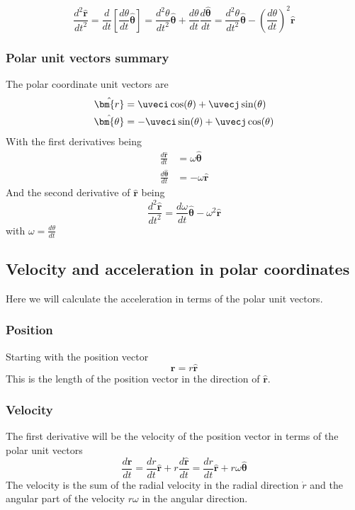 \begin{equation} \label{eq:radvel}
\frac{d^2 {\hat{\bm{r}}}}{d t^2} = \frac{d}{dt}\left[ \frac{ d \theta}{d t} \hat{\bm{\theta}} \right]=\frac{d^2 \theta}{d t^2}\hat{\bm{\theta}}+\frac{d \theta}{d t} \frac{d \hat{\bm{\theta}}}{dt}=\frac{d^2 \theta}{d t^2}\hat{\bm{\theta}}-\left(\frac{d \theta}{d t} \right)^2  \hat{\bm{r}} 
\end{equation}

\begin{framed}
\subsubsection*{Polar unit vectors summary}
The polar coordinate unit vectors are
\begin{align*}
\hat{\bm{r}} &= \uveci \cos( \theta ) + \uvecj \sin( \theta ) \\
\hat{\bm{\theta}}  &= - \uveci \sin( \theta ) + \uvecj \cos( \theta )
\end{align*}
With the first derivatives being
\begin{align*}
\frac{d {\hat{\bm{r}}}}{d t} &=  \omega \hat{\bm{\theta}} \\
\frac{d {\hat{\bm{\theta}}}}{d t} &=-\omega \hat{\bm{r}}
\end{align*}
And the second derivative of $\hat{\bm{r}}$ being
\begin{equation*}
\frac{d^2 {\hat{\bm{r}}}}{d t^2} =\frac{d \omega}{d t}\hat{\bm{\theta}}-\omega^2  \hat{\bm{r}} 
\end{equation*}
with $\omega = \frac{d \theta}{d t}$
\end{framed}

\subsection{Velocity and acceleration in polar coordinates}
Here we will calculate the acceleration in terms of the polar unit vectors. 

\subsubsection{Position}
Starting with the position vector
\begin{equation}
\textbf{r}= r \hat{\textbf{r}}
\end{equation}
This is the length of the position vector in the direction of $\hat{\bm{r}}$.

\subsubsection{Velocity}
The first derivative will be the velocity of the position vector in terms of the polar unit vectors
\begin{equation}\label{eq:vel}
\frac{d \bm{r}}{d t} = \frac{d r}{d t} \hat{\bm{r}} + r \frac{d \hat{\bm{r}}}{d t}=\frac{d r}{d t} \hat{\bm{r}} + r \omega \hat{\bm{\theta}}
\end{equation}
The velocity is the sum of the radial velocity in the radial direction $\dot{r}$ and the angular part of the velocity $r \omega$ in the angular direction.

